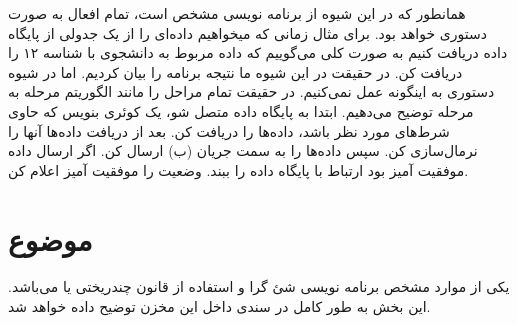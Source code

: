 \documentclass[20pt, a4paper]{article}
\begin{document}
همانطور که در این شیوه از برنامه نویسی مشخص است، تمام افعال به صورت دستوری خواهد
بود. برای مثال زمانی که میخواهیم داده‌ای را از یک جدولی از پایگاه داده دریافت
کنیم به صورت کلی می‌گوییم که داده مربوط به دانشجوی با شناسه ۱۲ را دریافت کن. در
حقیقت در این شیوه ما نتیجه برنامه را بیان کردیم. اما در شیوه دستوری به اینگونه
عمل نمی‌کنیم. در حقیقت تمام مراحل را مانند الگوریتم مرحله به مرحله توضیح
می‌دهیم. ابتدا به پایگاه داده متصل شو، یک کوئری بنویس که حاوی شرط‌های مورد نظر
باشد، داده‌ها را دریافت کن. بعد از دریافت داده‌ها آنها را نرمال‌سازی کن. سپس
داده‌ها را به سمت جریان (ب) ارسال کن. اگر ارسال داده موفقیت آمیز بود ارتباط با
پایگاه داده را ببند. وضعیت را موفقیت آمیز اعلام کن.

\section{موضوع }

یکی از موارد مشخص برنامه نویسی شئ گرا و استفاده از قانون چندریختی یا
 می‌باشد. این بخش به طور کامل در سندی داخل این مخزن توضیح داده‌
خواهد شد.
\end{document}
